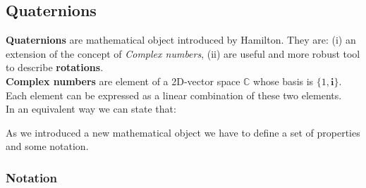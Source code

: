 \subsection{Quaternions}
\textbf{Quaternions} are mathematical object introduced by Hamilton. They are: (i) an extension of the concept of \textit{Complex numbers}, (ii) are useful and more robust tool to describe \textbf{rotations}. \\
\textbf{Complex numbers} are element of a 2D-vector space $\mathbb{C}$ whose basis is $\{1,\mathbf{i}\}$. Each element can be expressed as a linear combination of these two elements.\\
In an equivalent way we can state that:\\

\hspace*{-5mm}
%

\noindent
As we introduced a new mathematical object we have to define a set of properties and some notation.

{\color{red} \subsubsection*{Notation}}

